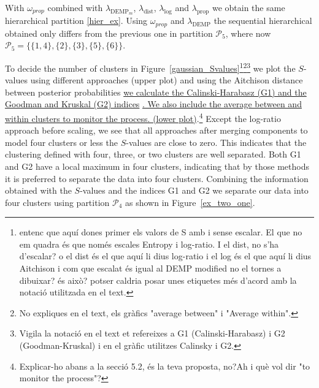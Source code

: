 \documentclass[submit]{smj}
\theoremstyle{definition}
\begin{document}
With $\omega_{prop}$ combined with $\lambda_{\text{DEMP}_m}$, $\lambda_{\text{dist}}$, $\lambda_{\log}$ and $\lambda_{\text{prop}}$ we obtain the same hierarchical partition \ref{hier_ex}. Using $\omega_{prop}$ and $\lambda_{\text{DEMP}}$ the sequential hierarchical obtained only differs from the previous one  in partition $\mathcal{P}_5$, where now $\mathcal{P}_5 = \{\{1, 4\},\{2\}, \{3\},\{5\},\{6\} \}$.

To decide the number of clusters in Figure~\ref{gaussian_Svalues}\footnote{entenc que aquí dones primer els valors de S amb i sense escalar. El que no em quadra és que només escales Entropy i log-ratio. I el dist, no s'ha d'escalar? o el dist és el que aquí li dius log-ratio i el log és el que aquí li dius Aitchison i com que escalat és igual al DEMP modified no el tornes a dibuixar? és això? potser caldria posar unes etiquetes més d'acord amb la notació utilitzada en el text.}\footnote{No expliques en el text, els gràfics "average between" i "Average within".}\footnote{Vigila la notació en el text et refereixes a G1 (Calinski-Harabasz) i G2 (Goodman-Kruskal) i en el gràfic utilitzes Calinsky i G2. } we plot the $S$-values using different approaches (upper plot) and using the Aitchison distance between posterior probabilities \ul{we calculate the Calinski-Harabasz (G1) and the Goodman and Kruskal (G2) indices} \citep{milligan1985}\ul{. We also include the average between and within clusters to monitor the process. (lower plot)}.\footnote{Explicar-ho abans a la secció 5.2, és la teva proposta, no?Ah i què vol dir "to monitor the process"?}  Except the log-ratio approach before scaling, we see that all approaches after merging components to model four clusters or less the $S$-values are close to zero. This indicates that the clustering defined with four, three, or two clusters are well separated. Both G1 and G2 have a local maximum in four clusters, indicating that by those methods it is preferred to separate the data into four clusters. Combining the information obtained with the $S$-values and the indices G1 and G2 we separate our data into four clusters using partition $\mathcal{P}_4$ as shown in Figure~\ref{ex_two_one}.
\end{document}
